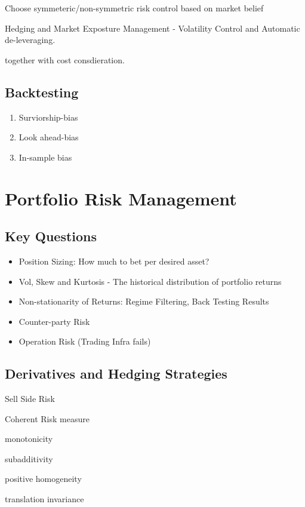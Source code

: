 \documentclass[11pt, openany]{book}              %
\begin{document}
Choose symmeteric/non-symmetric risk control based on market belief

Hedging and Market Exposture Management - Volatility Control and Automatic de-leveraging. 

together with cost consdieration. 

\section{Backtesting}

\begin{enumerate}
 \item Surviorship-bias
 \item Look ahead-bias
 \item In-sample bias
\end{enumerate}

\chapter{Portfolio Risk Management}

\section{Key Questions}

\begin{itemize}
\item Position Sizing: How much to bet per desired asset?
\item Vol, Skew and Kurtosis - The historical distribution of portfolio returns
\item Non-stationarity of Returns: Regime Filtering, Back Testing Results
\item Counter-party Risk
\item Operation Risk (Trading Infra fails)
\end{itemize}

\section{Derivatives and Hedging Strategies}


Sell Side Risk

Coherent  Risk measure

monotonicity

subadditivity

positive homogeneity

translation invariance
\end{document}

